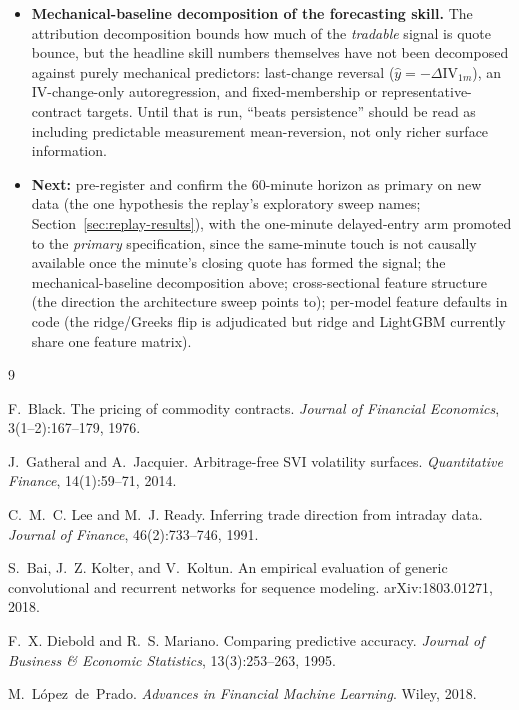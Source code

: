 \documentclass[11pt]{article}
\newcommand{\dIV}{\Delta\mathrm{IV}}
\begin{document}
\begin{itemize}
    exclusion (attacks sign misclassification).
  \item \textbf{Mechanical-baseline decomposition of the forecasting
    skill.} The attribution decomposition bounds how much of the
    \emph{tradable} signal is quote bounce, but the headline skill numbers
    themselves have not been decomposed against purely mechanical
    predictors: last-change reversal ($\hat{y} = -\dIV_{1m}$), an
    IV-change-only autoregression, and fixed-membership or
    representative-contract targets. Until that is run, ``beats
    persistence'' should be read as including predictable measurement
    mean-reversion, not only richer surface information.
  \item \textbf{Next:} pre-register and confirm the 60-minute horizon as
    primary on new data (the one hypothesis the replay's exploratory sweep
    names; Section~\ref{sec:replay-results}), with the one-minute
    delayed-entry arm promoted to the \emph{primary} specification, since
    the same-minute touch is not causally available once the minute's
    closing quote has formed the signal; the mechanical-baseline
    decomposition above; cross-sectional feature
    structure (the direction the architecture sweep points to); per-model
    feature defaults in code (the ridge/Greeks flip is adjudicated but
    ridge and LightGBM currently share one feature matrix).
\end{itemize}

\begin{thebibliography}{9}

F.~Black.
\newblock The pricing of commodity contracts.
\newblock \emph{Journal of Financial Economics}, 3(1--2):167--179, 1976.

J.~Gatheral and A.~Jacquier.
\newblock Arbitrage-free SVI volatility surfaces.
\newblock \emph{Quantitative Finance}, 14(1):59--71, 2014.

C.~M.~C. Lee and M.~J. Ready.
\newblock Inferring trade direction from intraday data.
\newblock \emph{Journal of Finance}, 46(2):733--746, 1991.

S.~Bai, J.~Z. Kolter, and V.~Koltun.
\newblock An empirical evaluation of generic convolutional and recurrent
  networks for sequence modeling.
\newblock arXiv:1803.01271, 2018.

F.~X. Diebold and R.~S. Mariano.
\newblock Comparing predictive accuracy.
\newblock \emph{Journal of Business \& Economic Statistics}, 13(3):253--263,
  1995.

M.~L\'opez~de~Prado.
\newblock \emph{Advances in Financial Machine Learning}.
\newblock Wiley, 2018.

\end{thebibliography}
\end{document}
